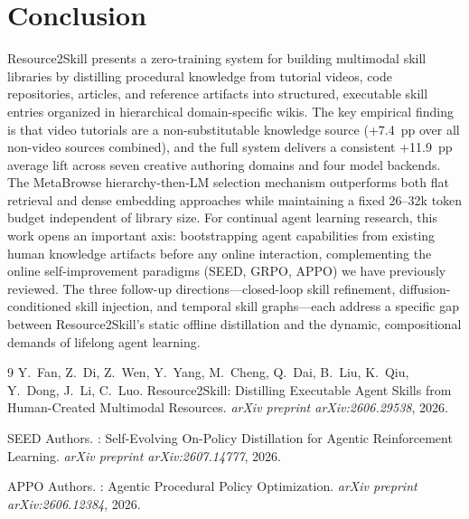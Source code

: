 \documentclass[11pt,a4paper]{article}
\begin{document}
\section{Conclusion}

Resource2Skill presents a zero-training system for building multimodal skill libraries by distilling procedural knowledge from tutorial videos, code repositories, articles, and reference artifacts into structured, executable skill entries organized in hierarchical domain-specific wikis. The key empirical finding is that video tutorials are a non-substitutable knowledge source (+7.4~pp over all non-video sources combined), and the full system delivers a consistent +11.9~pp average lift across seven creative authoring domains and four model backends. The MetaBrowse hierarchy-then-LM selection mechanism outperforms both flat retrieval and dense embedding approaches while maintaining a fixed 26--32k token budget independent of library size. For continual agent learning research, this work opens an important axis: bootstrapping agent capabilities from existing human knowledge artifacts before any online interaction, complementing the online self-improvement paradigms (SEED, GRPO, APPO) we have previously reviewed. The three follow-up directions---closed-loop skill refinement, diffusion-conditioned skill injection, and temporal skill graphs---each address a specific gap between Resource2Skill's static offline distillation and the dynamic, compositional demands of lifelong agent learning.


\begin{thebibliography}{9}
Y.~Fan, Z.~Di, Z.~Wen, Y.~Yang, M.~Cheng, Q.~Dai, B.~Liu, K.~Qiu, Y.~Dong, J.~Li, C.~Luo.
\newblock Resource2Skill: Distilling Executable Agent Skills from Human-Created Multimodal Resources.
\newblock \emph{arXiv preprint arXiv:2606.29538}, 2026.

{SEED Authors}.
: Self-Evolving On-Policy Distillation for Agentic Reinforcement Learning.
\newblock \emph{arXiv preprint arXiv:2607.14777}, 2026.

{APPO Authors}.
: Agentic Procedural Policy Optimization.
\newblock \emph{arXiv preprint arXiv:2606.12384}, 2026.
\end{thebibliography}
\end{document}

